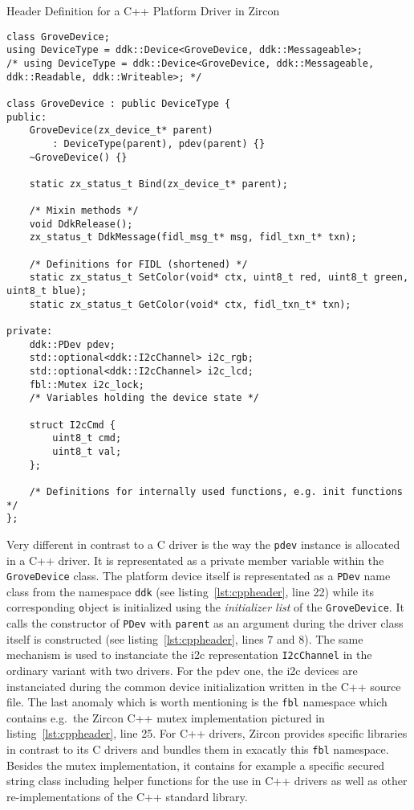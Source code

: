 \begin{listing} [H]
    \caption{Header Definition for a C++ Platform Driver in Zircon}
\label{lst:cppheader}
\begin{verbatim}
class GroveDevice;
using DeviceType = ddk::Device<GroveDevice, ddk::Messageable>;
/* using DeviceType = ddk::Device<GroveDevice, ddk::Messageable, ddk::Readable, ddk::Writeable>; */

class GroveDevice : public DeviceType {
public:
    GroveDevice(zx_device_t* parent)
        : DeviceType(parent), pdev(parent) {}
    ~GroveDevice() {}

    static zx_status_t Bind(zx_device_t* parent);

    /* Mixin methods */
    void DdkRelease();
    zx_status_t DdkMessage(fidl_msg_t* msg, fidl_txn_t* txn);

    /* Definitions for FIDL (shortened) */
    static zx_status_t SetColor(void* ctx, uint8_t red, uint8_t green, uint8_t blue);
    static zx_status_t GetColor(void* ctx, fidl_txn_t* txn);

private:
    ddk::PDev pdev;
    std::optional<ddk::I2cChannel> i2c_rgb;
    std::optional<ddk::I2cChannel> i2c_lcd;
    fbl::Mutex i2c_lock;
    /* Variables holding the device state */

    struct I2cCmd {
        uint8_t cmd;
        uint8_t val;
    };

    /* Definitions for internally used functions, e.g. init functions */
};
\end{verbatim}
\end{listing}

Very different in contrast to a C driver is the way the \texttt{pdev} instance is allocated in a C++ driver.
It is representated as a private member variable within the \texttt{GroveDevice} class.
The platform device itself is representated as a \texttt{PDev} name class from the namespace \texttt{ddk} (see listing~\ref{lst:cppheader}, line 22) while its corresponding \texttt object is initialized using the \textit{initializer list} of the \texttt{GroveDevice}.
It calls the constructor of \texttt{PDev} with \texttt{parent} as an argument during the driver class itself is constructed (see listing~\ref{lst:cppheader}, lines 7 and 8).
The same mechanism is used to instanciate the \ac{i2c} representation \texttt{I2cChannel} in the ordinary variant with two drivers.
For the pdev one, the \ac{i2c} devices are instanciated during the common device initialization written in the C++ source file.
The last anomaly which is worth mentioning is the \texttt{fbl} namespace which contains e.g.\ the Zircon C++ mutex implementation pictured in listing~\ref{lst:cppheader}, line 25.
For C++ drivers, Zircon provides specific libraries in contrast to its C drivers and bundles them in exacatly this \texttt{fbl} namespace.
Besides the mutex implementation, it contains for example a specific secured string class including helper functions for the use in C++ drivers as well as other re-implementations of the C++ standard library.

